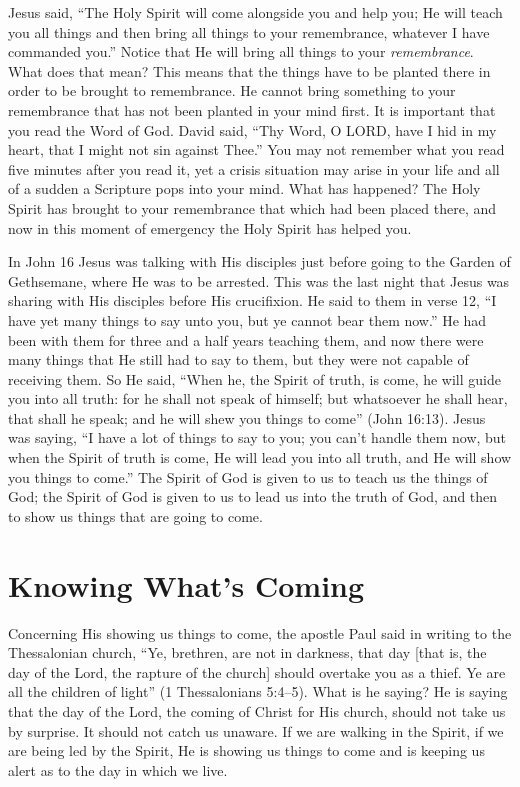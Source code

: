 Jesus said, “The Holy Spirit will come alongside you 
and help you; He will teach you all things and then bring all 
things to your remembrance, whatever I have commanded 
you.” Notice that He will bring all things to your  \emph{remembrance}.
 What does that mean? This means that the things 
have to be planted there in order to be brought to remembrance. He cannot bring something to your remembrance 
that has not been planted in your mind first. It is important 
that you read the Word of God. David said, “Thy Word, O 
LORD, have I hid in my heart, that I might not sin against 
Thee.” You may not remember what you read five minutes 
after you read it, yet a crisis situation may arise in your life 
and all of a sudden a Scripture pops into your mind. What 
has happened? The Holy Spirit has brought to your remembrance that which had been placed there, and now in this 
moment of emergency the Holy Spirit has helped you.

In John 16 Jesus was talking with His disciples just 
before going to the Garden of Gethsemane, where He was 
to be arrested. This was the last night that Jesus was sharing 
with His disciples before His crucifixion. He said to them in 
verse 12, “I have yet many things to say unto you, but ye 
cannot bear them now.” He had been with them for three 
and a half years teaching them, and now there were many 
things that He still had to say to them, but they were not 
capable of receiving them. So He said, “When he, the Spirit 
of truth, is come, he will guide you into all truth: for he 
shall not speak of himself; but whatsoever he shall hear, that 
shall he speak; and he will shew you things to come” (John 
16:13). Jesus was saying, “I have a lot of things to say to you; 
you can’t handle them now, but when the Spirit of truth is 
come, He will lead you into all truth, and He will show you 
things to come.” The Spirit of God is given to us to teach us 
the things of God; the Spirit of God is given to us to lead us 
into the truth of God, and then to show us things that are 
going to come.


\section*{Knowing What's Coming}

Concerning His showing us things to come, the apostle 
Paul said in writing to the Thessalonian church, “Ye, brethren, are not in darkness, that day [that is, the day of the 
Lord, the rapture of the church] should overtake you as a 
thief. Ye are all the children of light” (1 Thessalonians 5:4–5). 
What is he saying? He is saying that the day of the Lord, 
the coming of Christ for His church, should not take us by 
surprise. It should not catch us unaware. If we are walking 
in the Spirit, if we are being led by the Spirit, He is showing 
us things to come and is keeping us alert as to the day in 
which we live.

